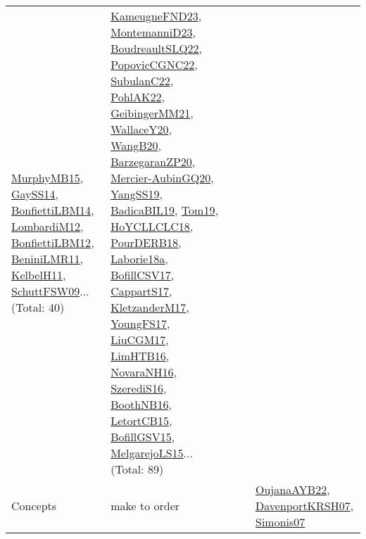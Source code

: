 {\begin{longtable}{lp{3cm}>{\raggedright}p{6cm}>{\raggedright}p{6cm}p{8cm}}
\href{papers/MurphyMB15.pdf}{MurphyMB15}\cite{MurphyMB15}, \href{papers/GaySS14.pdf}{GaySS14}\cite{GaySS14}, \href{articles/BonfiettiLBM14.pdf}{BonfiettiLBM14}\cite{BonfiettiLBM14}, \href{articles/LombardiM12.pdf}{LombardiM12}\cite{LombardiM12}, \href{papers/BonfiettiLBM12.pdf}{BonfiettiLBM12}\cite{BonfiettiLBM12}, \href{articles/BeniniLMR11.pdf}{BeniniLMR11}\cite{BeniniLMR11}, \href{articles/KelbelH11.pdf}{KelbelH11}\cite{KelbelH11}, \href{papers/SchuttFSW09.pdf}{SchuttFSW09}\cite{SchuttFSW09}... (Total: 40) & \href{papers/KameugneFND23.pdf}{KameugneFND23}\cite{KameugneFND23}, \href{articles/MontemanniD23.pdf}{MontemanniD23}\cite{MontemanniD23}, \href{papers/BoudreaultSLQ22.pdf}{BoudreaultSLQ22}\cite{BoudreaultSLQ22}, \href{papers/PopovicCGNC22.pdf}{PopovicCGNC22}\cite{PopovicCGNC22}, \href{articles/SubulanC22.pdf}{SubulanC22}\cite{SubulanC22}, \href{articles/PohlAK22.pdf}{PohlAK22}\cite{PohlAK22}, \href{papers/GeibingerMM21.pdf}{GeibingerMM21}\cite{GeibingerMM21}, \href{articles/WallaceY20.pdf}{WallaceY20}\cite{WallaceY20}, \href{papers/WangB20.pdf}{WangB20}\cite{WangB20}, \href{papers/BarzegaranZP20.pdf}{BarzegaranZP20}\cite{BarzegaranZP20}, \href{papers/Mercier-AubinGQ20.pdf}{Mercier-AubinGQ20}\cite{Mercier-AubinGQ20}, \href{papers/YangSS19.pdf}{YangSS19}\cite{YangSS19}, \href{papers/BadicaBIL19.pdf}{BadicaBIL19}\cite{BadicaBIL19}, \href{papers/Tom19.pdf}{Tom19}\cite{Tom19}, \href{papers/HoYCLLCLC18.pdf}{HoYCLLCLC18}\cite{HoYCLLCLC18}, \href{articles/PourDERB18.pdf}{PourDERB18}\cite{PourDERB18}, \href{papers/Laborie18a.pdf}{Laborie18a}\cite{Laborie18a}, \href{papers/BofillCSV17.pdf}{BofillCSV17}\cite{BofillCSV17}, \href{papers/CappartS17.pdf}{CappartS17}\cite{CappartS17}, \href{papers/KletzanderM17.pdf}{KletzanderM17}\cite{KletzanderM17}, \href{papers/YoungFS17.pdf}{YoungFS17}\cite{YoungFS17}, \href{papers/LiuCGM17.pdf}{LiuCGM17}\cite{LiuCGM17}, \href{papers/LimHTB16.pdf}{LimHTB16}\cite{LimHTB16}, \href{articles/NovaraNH16.pdf}{NovaraNH16}\cite{NovaraNH16}, \href{papers/SzerediS16.pdf}{SzerediS16}\cite{SzerediS16}, \href{papers/BoothNB16.pdf}{BoothNB16}\cite{BoothNB16}, \href{articles/LetortCB15.pdf}{LetortCB15}\cite{LetortCB15}, \href{papers/BofillGSV15.pdf}{BofillGSV15}\cite{BofillGSV15}, \href{papers/MelgarejoLS15.pdf}{MelgarejoLS15}\cite{MelgarejoLS15}... (Total: 89)\\
Concepts & make to order &  &  & \href{papers/OujanaAYB22.pdf}{OujanaAYB22}\cite{OujanaAYB22}, \href{papers/DavenportKRSH07.pdf}{DavenportKRSH07}\cite{DavenportKRSH07}, \href{articles/Simonis07.pdf}{Simonis07}\cite{Simonis07}\\

\end{longtable}}

